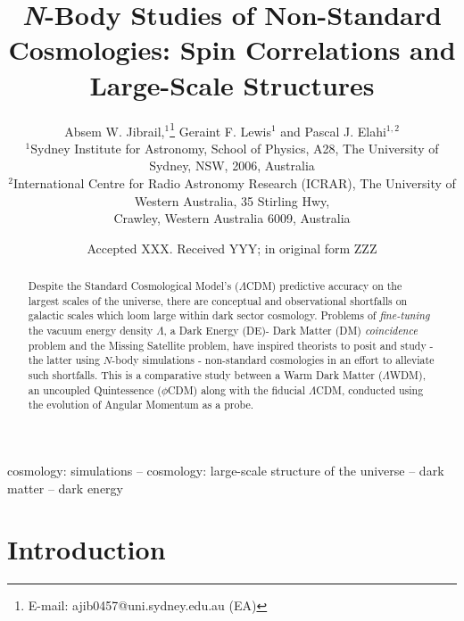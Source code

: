 \documentclass[a4paper,fleqn,usenatbib]{mnras}
\title[\textit{N}-Body Studies of Non-Standard Cosmologies]{ \textit{N}-Body Studies of Non-Standard Cosmologies: Spin Correlations and Large-Scale Structures }
\author[A. W. Jibrail et al.]{
Absem W. Jibrail,$^{1}$\thanks{E-mail: ajib0457@uni.sydney.edu.au (EA)}
Geraint F. Lewis$^{1}$
and Pascal J. Elahi$^{1,2}$
\\
$^{1}$Sydney Institute for Astronomy, School of Physics, A28, The University of Sydney, NSW, 2006, Australia\\
$^{2}$International Centre for Radio Astronomy Research (ICRAR), The University of Western Australia, 35 Stirling Hwy, \\
Crawley, Western Australia 6009, Australia}
\date{Accepted XXX. Received YYY; in original form ZZZ}
\def \lcdm{$\Lambda$CDM}
\def \lwdm{$\Lambda$WDM}
\def \qcdm{$\phi$CDM}
\begin{document}
\label{firstpage}
\pagerange{\pageref{firstpage}--\pageref{lastpage}}
\maketitle

\begin{abstract}
Despite the Standard Cosmological Model's ($\Lambda$CDM) predictive accuracy on the largest scales of the universe, there are conceptual and observational shortfalls on galactic scales which loom large within dark sector cosmology. Problems of \textit{fine-tuning} the vacuum energy density $\Lambda$, a Dark Energy (DE)- Dark Matter (DM) \textit{coincidence} problem and the Missing Satellite problem, have inspired theorists to posit and study - the latter using $N$-body simulations - non-standard cosmologies in an effort to alleviate such shortfalls. This is a comparative study between a Warm Dark Matter (\lwdm), an uncoupled Quintessence (\qcdm) along with the fiducial \lcdm, conducted using the evolution of Angular Momentum as a probe.  

\end{abstract}

\begin{keywords}
cosmology: simulations -- cosmology: large-scale structure of the universe -- dark matter -- dark energy
\end{keywords}



\section{Introduction}
\end{document}
